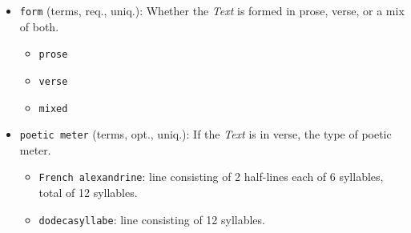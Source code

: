\begin{itemize}
\begin{multicols}{2}
\begin{itemize}
            \item \texttt{gmh}: Middle High German (ca. 1050-1500)
            \item \texttt{gml}: Middle Low German
            \item \texttt{isl}: Islandic
            \item \texttt{ita}: Italian
            \item \texttt{mga}: Middle Irish (900-1200)
            \item \texttt{non}: Old Norse
            \item \href{https://www.wikidata.org/wiki/Q12330003}{\texttt{non\_DAN}}: Old East Norse, Old Danish (800-1100)
            \item \href{https://www.wikidata.org/wiki/Q2417210}{\texttt{non\_SWE}}: Old Swedish (800-1500)
            \item \texttt{oco}: Old Cornish
            \item \texttt{por}: Portugese
            \item \texttt{pro}: Old Occitan, Old Provençal (to 1500)
            \item \texttt{spa}: Spanish or Castilian
            \item \texttt{wlm}: Middle Welsh
            \item \href{https://data.biblissima.fr/w/Item:Q286307}{\texttt{xno}}: Anglo-French, Anglo-Norman
        \end{itemize}
    \end{multicols}
    \item \texttt{form} (terms, req., uniq.): Whether the \textit{Text} is formed in prose, verse, or a mix of both.
    \begin{multicols}{4}
        \begin{itemize}
            \item \texttt{prose}
            \item \texttt{verse}
            \item \texttt{mixed}
        \end{itemize}
    \end{multicols}
    \item \texttt{poetic meter} (terms, opt., uniq.): If the \textit{Text} is in verse, the type of poetic meter.
        \begin{itemize}
            \item \texttt{French alexandrine}: line consisting of 2 half-lines each of 6 syllables, total of 12 syllables.
            \item \texttt{dodecasyllabe}: line consisting of 12 syllables.

\end{itemize}
\end{itemize}
